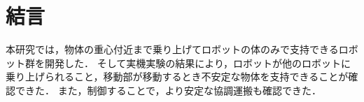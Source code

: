 \section{結言}
本研究では，物体の重心付近まで乗り上げてロボットの体のみで支持できるロボット群を開発した．
そして実機実験の結果により，ロボットが他のロボットに乗り上げられること，移動部が移動するとき不安定な物体を支持できることが確認できた．
また，制御することで，より安定な協調運搬も確認できた．

